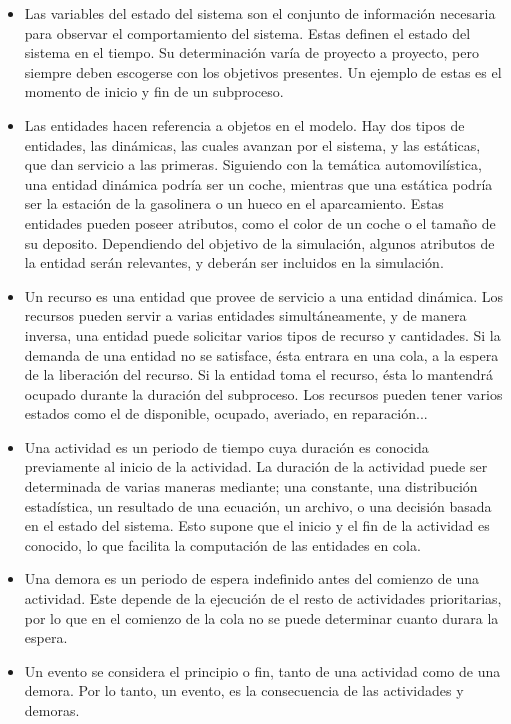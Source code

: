 \documentclass[12pt]{article}
\begin{document}
\begin{itemize}
\item Las variables del estado del sistema son el conjunto de información necesaria para observar el comportamiento del sistema. Estas definen el estado del sistema en el tiempo. Su determinación varía de proyecto a proyecto, pero siempre deben escogerse con los objetivos presentes. Un ejemplo de estas es el momento de inicio y fin de un subproceso.
\item Las entidades hacen referencia a objetos en el modelo. Hay dos tipos de entidades, las dinámicas, las cuales avanzan por el sistema, y las estáticas, que dan servicio a las primeras. Siguiendo con la temática automovilística, una entidad dinámica podría ser un coche, mientras que una estática podría ser la estación de la gasolinera o un hueco en el aparcamiento. Estas entidades pueden poseer atributos, como el color de un coche o el tamaño de su deposito. Dependiendo del objetivo de la simulación, algunos atributos de la entidad serán relevantes, y deberán ser incluidos en la simulación.
\item Un recurso es una entidad que provee de servicio a una entidad dinámica. Los recursos pueden servir a varias entidades simultáneamente, y de manera inversa, una entidad puede solicitar varios tipos de recurso y cantidades. Si la demanda de una entidad no se satisface, ésta entrara en una cola, a la espera de la liberación del recurso. Si la entidad toma el recurso, ésta lo mantendrá ocupado durante la duración del subproceso. Los recursos pueden tener varios estados como el de disponible, ocupado, averiado, en reparación...
\item Una actividad es un periodo de tiempo cuya duración es conocida  previamente al inicio de la actividad. La duración de la actividad puede ser determinada de varias maneras mediante; una constante, una distribución estadística, un resultado de una ecuación, un archivo, o una decisión basada en el estado del sistema. Esto supone que el inicio y el fin de la actividad es conocido, lo que facilita la computación de las entidades en cola.
\item Una demora es un periodo de espera indefinido antes del comienzo de una actividad. Este depende de la ejecución de el resto de actividades prioritarias, por lo que en el comienzo de la cola no se puede determinar cuanto durara la espera.
\item Un evento se considera el principio o fin, tanto de una actividad como de una demora. Por lo tanto, un evento, es la consecuencia de las actividades y demoras.
\end{itemize}
\end{document}
